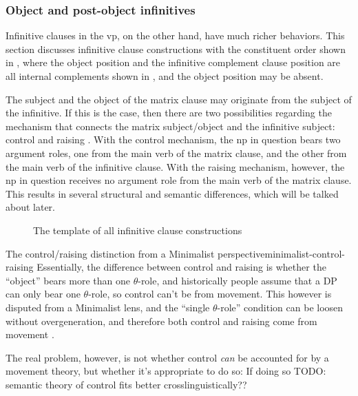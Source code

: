 \documentclass[UTF8, a4paper, oneside, scheme=plain]{ctexrep}
\newcommand*{\citepages}[1]{pp.~{#1}}
\begin{document}
\subsubsection{Object and post-object infinitives}

Infinitive clauses in the \acs{vp},
on the other hand, 
have much richer behaviors.
This section discusses infinitive clause constructions with the constituent order 
shown in ,
where the object position and the infinitive complement clause position 
are all internal complements shown in ,
and the object position may be absent.

The subject and the object of the matrix clause may originate from the subject of the infinitive.
If this is the case,
then there are two possibilities regarding the mechanism that connects the matrix subject/object 
and the infinitive subject:
control and raising \citet[\citepages{1194-1197}]{cgel}.
With the control mechanism,
the \acs{np} in question bears two argument roles,
one from the main verb of the matrix clause, and the other from the main verb of the infinitive clause.
With the raising mechanism, however,
the \acs{np} in question receives no argument role from the main verb of the matrix clause.
This results in several structural and semantic differences,
which will be talked about later.

\begin{figure}
    \centering
    
    \caption{The template of all infinitive clause constructions}
    \label{fig:complement.infinitive.template}
\end{figure}

\begin{theorybox}{The control/raising distinction from a Minimalist perspective}{minimalist-control-raising}
    Essentially, the difference between control and raising is 
    whether the ``object'' bears more than one $\theta$-role,
    and historically people assume that a DP can only bear one $\theta$-role,
    so control can't be from movement.
    This however is disputed from a Minimalist lens,
    and the ``single $\theta$-role'' condition 
    can be loosen without overgeneration,
    and therefore both control and raising come from movement
    \citet{hornstein1999movement}. 

    The real problem, however, is not whether control \emph{can} be accounted for 
    by a movement theory, 
    but whether it's appropriate to do so:
    If doing so TODO: semantic theory of control fits better crosslinguistically??
\end{theorybox}
\end{document}
